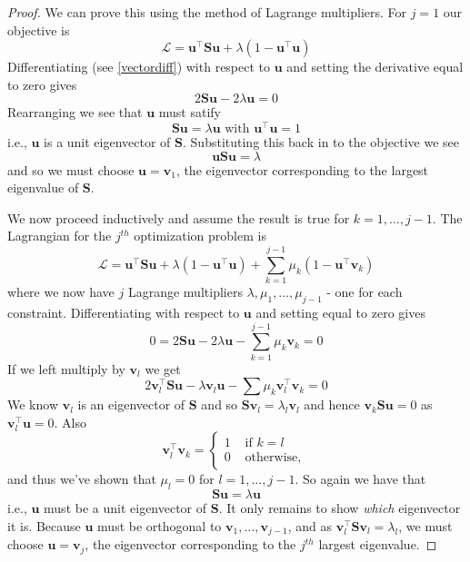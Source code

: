 \documentclass[]{book}
\theoremstyle{definition}
\theoremstyle{definition}
\theoremstyle{definition}
\theoremstyle{remark}
\begin{document}
\begin{proof}
{}We can prove this using the method of Lagrange multipliers. For \(j=1\) our objective is
\[\mathcal{L} = \mathbf u^\top  \mathbf S\mathbf u+\lambda(1-\mathbf u^\top \mathbf u)\]
Differentiating (see \ref{vectordiff}) with respect to \(\mathbf u\) and setting the derivative equal to zero gives
\[2\mathbf S\mathbf u-2\lambda \mathbf u=0\]
Rearranging we see that \(\mathbf u\) must satify
\[\mathbf S\mathbf u=\lambda \mathbf u\mbox{ with } \mathbf u^\top \mathbf u=1\]
i.e., \(\mathbf u\) is a unit eigenvector of \(\mathbf S\). Substituting this back in to the objective we see
\[\mathbf u\mathbf S\mathbf u= \lambda\]
and so we must choose \(\mathbf u=\mathbf v_1\), the eigenvector corresponding to the largest eigenvalue of \(\mathbf S\).

We now proceed inductively and assume the result is true for \(k=1, \ldots, j-1\). The Lagrangian for the \(j^{th}\) optimization problem is
\[\mathcal{L} = \mathbf u^\top  \mathbf S\mathbf u+\lambda(1-\mathbf u^\top \mathbf u) +\sum_{k=1}^{j-1}\mu_k (1-\mathbf u^\top \mathbf v_k)\]
where we now have \(j\) Lagrange multipliers \(\lambda, \mu_1, \ldots, \mu_{j-1}\) - one for each constraint.
Differentiating with respect to \(\mathbf u\) and setting equal to zero gives
\[0 = 2\mathbf S\mathbf u- 2\lambda \mathbf u- \sum_{k=1}^{j-1} \mu_k\mathbf v_k=0 \]
If we left multiply by \(\mathbf v_l\) we get
\[2\mathbf v_l^\top \mathbf S\mathbf u- \lambda \mathbf v_l \mathbf u- \sum \mu_k \mathbf v_l^\top \mathbf v_k =0\]
We know \(\mathbf v_l\) is an eigenvector of \(\mathbf S\) and so \(\mathbf S\mathbf v_l=\lambda_l \mathbf v_l\) and hence \(\mathbf v_k \mathbf S\mathbf u=0\) as \(\mathbf v_l^\top \mathbf u=0\). Also \[\mathbf v_l^\top\mathbf v_k=\begin{cases}1 &\mbox{ if } k=l\\
0 &\mbox{ otherwise, }\end{cases}\] and thus we've shown that \(\mu_l=0\) for \(l=1, \ldots, j-1\). So again we have that \[\mathbf S\mathbf u= \lambda \mathbf u\]
i.e., \(\mathbf u\) must be a unit eigenvector of \(\mathbf S\). It only remains to show \emph{which} eigenvector it is. Because \(\mathbf u\) must be orthogonal to \(\mathbf v_1, \ldots, \mathbf v_{j-1}\),
and as \(\mathbf v_l^\top \mathbf S\mathbf v_l = \lambda_l\), we must choose \(\mathbf u=\mathbf v_j\), the eigenvector corresponding to the \(j^{th}\) largest eigenvalue.
\end{proof}
\end{document}
